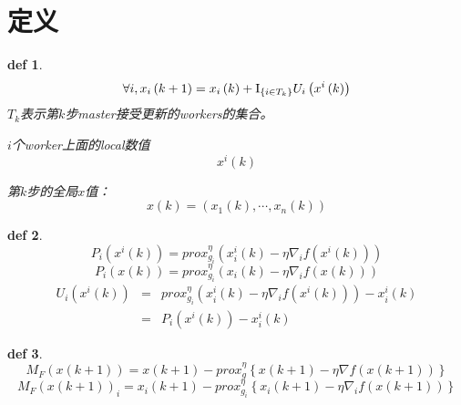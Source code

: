 \documentclass{ctexart}
\begin{document}
\newtheorem{mydef}{def}
\newtheorem{myth}{Th}
\newtheorem{myproof}{Proof}
\newtheorem{myas}{Assumption}

\section{定义}

\begin{mydef}
\begin{equation}\label{eq:1}
  \forall i,{x_i}\left( {k + 1} \right) = {x_i}\left( k \right) + {{\rm I}_{\left\{ {i \in {T_k}} \right\}}}{U_i}\left( {{x^i}\left( k \right)} \right)
\end{equation}
$T_k$表示第$k$步master接受更新的workers的集合。

$i$个worker上面的local数值
\begin{equation}\label{eq:2}
  x^{i}\left(k\right)
\end{equation}

第$k$步的全局$x$值：
\begin{equation}\label{eq:3}
  x\left(k\right)=\left(x_1(k),\cdots,x_n(k)\right)
\end{equation}
\end{mydef}

\begin{mydef}
\begin{equation}\label{eq:4}
    P_i \left(x^i \left(k\right)\right) = prox_{{g_i}}^\eta \left( {x_i^i\left( k \right) - \eta {\nabla _i}f\left( {{x^i}\left( k \right)} \right)} \right)
\end{equation}
\begin{equation}\label{eq:5}
    P_i \left(x \left(k\right)\right) = prox_{{g_i}}^\eta \left( {{x_i}\left( k \right) - \eta {\nabla _i}f\left( {x\left( k \right)} \right)} \right)
\end{equation}
\begin{eqnarray}
  {U_i}\left( {{x^i}\left( k \right)} \right) &=& prox_{{g_i}}^\eta \left( {x_i^i\left( k \right) - \eta {\nabla _i}f\left( {{x^i}\left( k \right)} \right)} \right) - x_i^i\left( k \right) \nonumber\\
   &=& P_i \left(x^i \left(k\right)\right) - x_i^i\left( k \right)
\end{eqnarray}
\end{mydef}

\begin{mydef}
\begin{equation}\label{eq:6}
  M_F\left(x\left( k+1\right)\right) =  x\left(k+1\right) - prox_{g}^{\eta} \left\{{x}\left( k+1\right) - \eta {\nabla}f\left( x\left(k+1\right)\right)\right\}
\end{equation}
\begin{equation}\label{eq:6.1}
  M_F\left(x\left( k+1\right)\right)_i =  x_i\left(k+1\right) - prox_{g_i}^{\eta} \left\{{x_i}\left( k+1\right) - \eta {\nabla_i}f\left( x\left(k+1\right)\right)\right\}
\end{equation}
\end{mydef}
\end{document}
